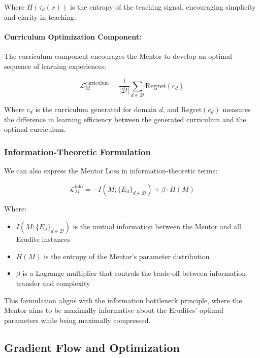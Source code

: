 Where $H(\tau_d(x))$ is the entropy of the teaching signal, encouraging simplicity and clarity in teaching.

\paragraph{Curriculum Optimization Component:}
The curriculum component encourages the Mentor to develop an optimal sequence of learning experiences:

\begin{equation}
\mathcal{L}_M^{\text{curriculum}} = \frac{1}{|\mathcal{D}|} \sum_{d \in \mathcal{D}} \text{Regret}(c_d)
\end{equation}

Where $c_d$ is the curriculum generated for domain $d$, and $\text{Regret}(c_d)$ measures the difference in learning efficiency between the generated curriculum and the optimal curriculum.

\subsubsection{Information-Theoretic Formulation}

We can also express the Mentor Loss in information-theoretic terms:

\begin{equation}
\mathcal{L}_M^{\text{info}} = -I(M; \{E_d\}_{d \in \mathcal{D}}) + \beta \cdot H(M)
\end{equation}

Where:
\begin{itemize}
\item $I(M; \{E_d\}_{d \in \mathcal{D}})$ is the mutual information between the Mentor and all Erudite instances
\item $H(M)$ is the entropy of the Mentor's parameter distribution
\item $\beta$ is a Lagrange multiplier that controls the trade-off between information transfer and complexity
\end{itemize}

This formulation aligns with the information bottleneck principle, where the Mentor aims to be maximally informative about the Erudites' optimal parameters while being maximally compressed.

\subsection{Gradient Flow and Optimization}

